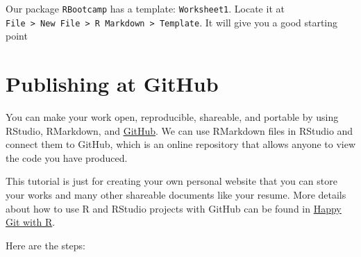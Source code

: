 \documentclass[
]{book}
\begin{document}
Our package \texttt{RBootcamp} has a template: \texttt{Worksheet1}. Locate it at \texttt{File\ \textgreater{}\ New\ File\ \textgreater{}\ R\ Markdown\ \textgreater{}\ Template}. It will give you a good starting point

\hypertarget{publishing-at-github}{%
\chapter{Publishing at GitHub}\label{publishing-at-github}}

You can make your work open, reproducible, shareable, and portable by using RStudio, RMarkdown, and \href{https://github.com}{GitHub}. We can use RMarkdown files in RStudio and connect them to GitHub, which is an online repository that allows anyone to view the code you have produced.

This tutorial is just for creating your own personal website that you can store your works and many other shareable documents like your resume. More details about how to use R and RStudio projects with GitHub can be found in \href{https://happygitwithr.com/new-github-first.html}{Happy Git with R}.

Here are the steps:
\end{document}
